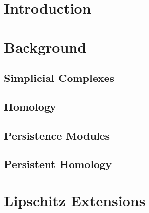 \documentclass[11pt]{article}
\title{}
\author{}
\date{}
\begin{document}
\section{Introduction}


\section{Background}
\subsection{Simplicial Complexes}

\subsection{Homology}

\subsection{Persistence Modules}

\subsection{Persistent Homology}


\section{Lipschitz Extensions}




\end{document}
